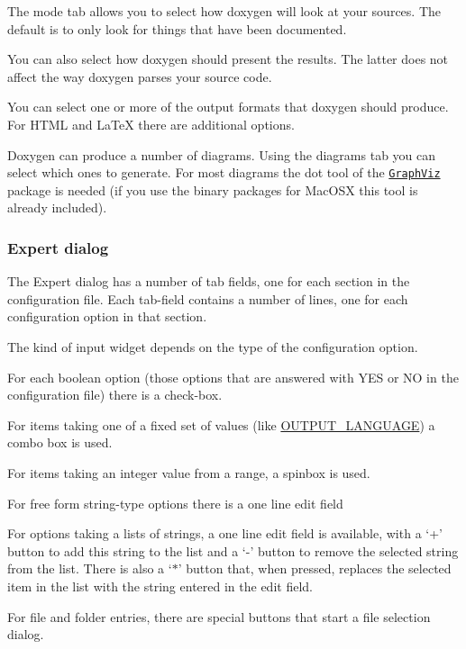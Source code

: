  The mode tab allows you to select how doxygen will look at your sources. The default is to only look for things that have been documented.

You can also select how doxygen should present the results. The latter does not affect the way doxygen parses your source code.

 You can select one or more of the output formats that doxygen should produce. For HTML and LaTeX there are additional options.

 Doxygen can produce a number of diagrams. Using the diagrams tab you can select which ones to generate. For most diagrams the dot tool of the \href{http://www.graphviz.org}{\tt GraphViz} package is needed (if you use the binary packages for MacOSX this tool is already included).

\subsubsection*{Expert dialog}

The Expert dialog has a number of tab fields, one for each section in the configuration file. Each tab-\/field contains a number of lines, one for each configuration option in that section.

The kind of input widget depends on the type of the configuration option. 
\begin{DoxyItemize}
\item For each boolean option (those options that are answered with YES or NO in the configuration file) there is a check-\/box. 
\item For items taking one of a fixed set of values (like \hyperlink{config_cfg_output_language}{OUTPUT\_\-LANGUAGE}) a combo box is used. 
\item For items taking an integer value from a range, a spinbox is used. 
\item For free form string-\/type options there is a one line edit field 
\item For options taking a lists of strings, a one line edit field is available, with a `+' button to add this string to the list and a `-\/' button to remove the selected string from the list. There is also a `$\ast$' button that, when pressed, replaces the selected item in the list with the string entered in the edit field. 
\item For file and folder entries, there are special buttons that start a file selection dialog. 
\end{DoxyItemize}

